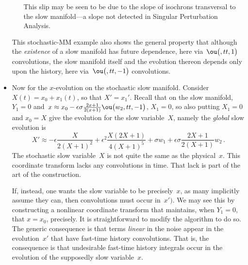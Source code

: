 \begin{itemize}
\begin{itemize}
This slip may be seen to be due to the slope of isochrons
transversal to the slow manifold---a slope not detected in
Singular Perturbation Analysis.

\end{itemize}
This stochastic-MM example also shows the general property
that although the \emph{existence} of a slow manifold has
future dependence, here via~\(\ou\big({},tt,1\big)\)
convolutions, the slow manifold itself and the evolution
thereon depends only upon the history, here
via~\(\ou\big({},tt,-1\big)\) convolutions.

\item Now for the \(x\)-evolution on the stochastic slow
manifold. Consider \(X(t)=x_0+x_1(t)\), so that \(X'=x_1'\).
Recall that on the slow manifold, \(Y_1=0\) and~\(x\approx
x_0-\epsilon  \sigma \frac {2x+1} {2(x+1)}
\ou\big(w_{2},tt,-1\big)\), \(X_1=0\), so also putting
\(X_1=0\) and \(x_0=X\) give the evolution for the slow
variable~\(X\), namely the \emph{global} slow evolution is
\begin{equation*}
X'\approx -\epsilon \frac{X}{2(X+1)^2} +\epsilon^2
\frac{X(2X+1)}{4(X+1)^ 5} +\sigma w_1 +\epsilon \sigma
\frac{2X+1}{2(X+1)}w_2\,.
\end{equation*}
The stochastic slow variable~\(X\) is not quite the same as
the physical~\(x\). This coordinate transform lacks any
convolutions in time. That lack is part of the art of the
construction.

If, instead, one wants the slow variable to be
precisely~\(x\), as many implicitly assume they can, then
convolutions must occur in~\(x')\). We may see this by
constructing a nonlinear coordinate transform that
maintains, when \(Y_1=0\), that \(x=x_0\), precisely.  It is
straightforward to modify the algorithm to do so.  The
generic consequence is that terms \emph{linear} in the noise
appear in the evolution~\(x'\) that have fast-time history
convolutions. That is, the consequence is that undesirable
fast-time history integrals occur in the evolution of the
supposedly slow variable~\(x\).




\end{itemize}

